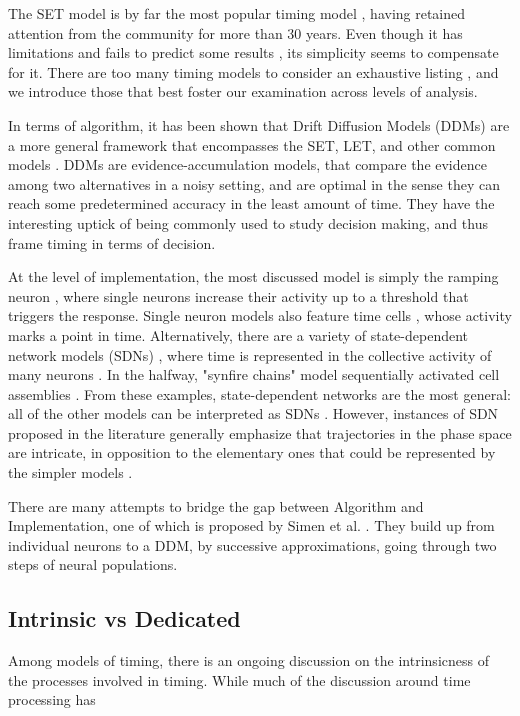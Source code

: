    The SET model is by far the most popular timing model \cite{}, having retained attention from the community for more than 30 years. Even though it has limitations and fails to predict some results \cite{machado2009learning}, its simplicity seems to compensate for it. There are too many timing models to consider an exhaustive listing \cite{}, and we introduce those that best foster our examination across levels of analysis. 
    
    In terms of algorithm, it has been shown that Drift Diffusion Models (DDMs) are a more general framework that encompasses the SET, LET, and other common models \cite{balci2016decision}. DDMs are evidence-accumulation models, that compare the evidence among two alternatives in a noisy setting, and are optimal in the sense they can reach some predetermined accuracy in the least amount of time. They have the interesting uptick of being commonly used to study decision making, and thus frame timing in terms of decision. 
    
    At the level of implementation, the most discussed model is simply the ramping neuron \cite{}, where single neurons increase their activity up to a threshold that triggers the response. Single neuron models also feature time cells \cite{}, whose activity marks a point in time. Alternatively, there are a variety of state-dependent network models (SDNs) \cite{}, where time is represented in the collective activity of many neurons \cite{}. In the halfway, "synfire chains" model sequentially activated cell assemblies \cite{}. From these examples, state-dependent networks are the most general: all of the other models can be interpreted as SDNs \cite{}. However, instances of SDN proposed in the literature generally emphasize that trajectories in the phase space are intricate, in opposition to the elementary ones that could be represented by the simpler models \cite{}.

    There are many attempts to bridge the gap between Algorithm and Implementation, one of which is proposed by Simen et al. \cite{}. They build up from individual neurons to a DDM, by successive approximations, going through two steps of neural populations.
    
    \subsection{Intrinsic vs Dedicated}
        Among models of timing, there is an ongoing discussion on the intrinsicness of the processes involved in timing. While much of the discussion around time processing has 
